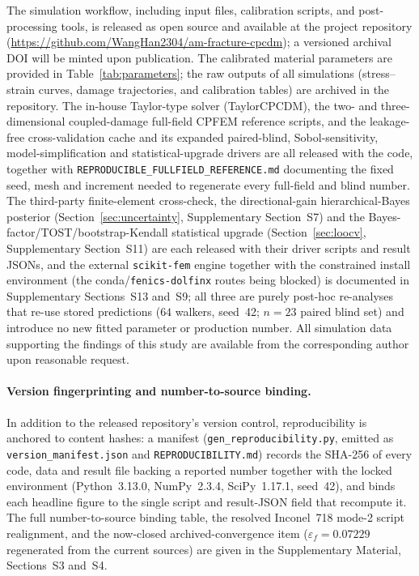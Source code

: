 \documentclass[twocolumn]{sagej}
\begin{document}
The simulation workflow, including input files, calibration scripts, and post-processing tools, is released as open source and available at the project repository (\url{https://github.com/WangHan2304/am-fracture-cpcdm}); a versioned archival DOI will be minted upon publication. The calibrated material parameters are provided in Table~\ref{tab:parameters}; the raw outputs of all simulations (stress--strain curves, damage trajectories, and calibration tables) are archived in the repository. The in-house Taylor-type solver (TaylorCPCDM), the two- and three-dimensional coupled-damage full-field CPFEM reference scripts, and the leakage-free cross-validation cache and its expanded paired-blind, Sobol-sensitivity, model-simplification and statistical-upgrade drivers are all released with the code, together with \texttt{REPRODUCIBLE\_FULLFIELD\_REFERENCE.md} documenting the fixed seed, mesh and increment needed to regenerate every full-field and blind number. The third-party finite-element cross-check, the directional-gain hierarchical-Bayes posterior (Section~\ref{sec:uncertainty}, Supplementary Section~S7) and the Bayes-factor/TOST/bootstrap-Kendall statistical upgrade (Section~\ref{sec:loocv}, Supplementary Section~S11) are each released with their driver scripts and result JSONs, and the external \texttt{scikit-fem} engine together with the constrained install environment (the conda/\texttt{fenics-dolfinx} routes being blocked) is documented in Supplementary Sections~S13 and~S9; all three are purely post-hoc re-analyses that re-use stored predictions ($64$ walkers, seed~42; $n=23$ paired blind set) and introduce no new fitted parameter or production number. All simulation data supporting the findings of this study are available from the corresponding author upon reasonable request.

\paragraph{Version fingerprinting and number-to-source binding.} In addition to the released repository's version control, reproducibility is anchored to content hashes: a manifest (\texttt{gen\_reproducibility.py}, emitted as \texttt{version\_manifest.json} and \texttt{REPRODUCIBILITY.md}) records the SHA-256 of every code, data and result file backing a reported number together with the locked environment (Python~3.13.0, NumPy~2.3.4, SciPy~1.17.1, seed~42), and binds each headline figure to the single script and result-JSON field that recompute it. The full number-to-source binding table, the resolved Inconel~718 mode-2 script realignment, and the now-closed archived-convergence item ($\varepsilon_f = 0.07229$ regenerated from the current sources) are given in the Supplementary Material, Sections~S3 and~S4.
\end{document}
